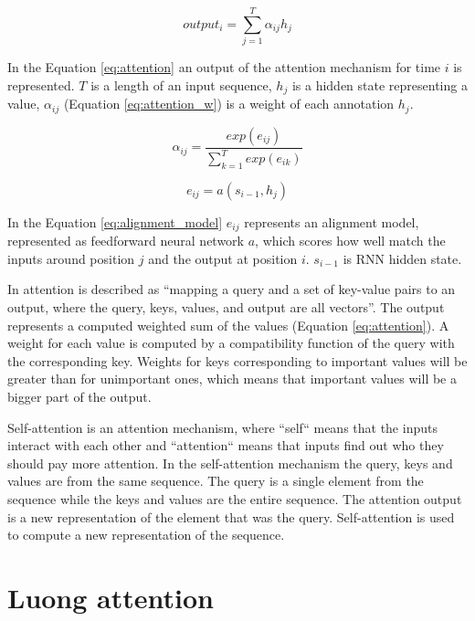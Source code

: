
\begin{equation} \label{eq:attention}
output_i = \sum_{j=1}^{T} \alpha_{ij} h_j
\end{equation}
 
In the Equation \ref{eq:attention} an output of the attention mechanism for time $i$ is represented. $T$ is a length of an input sequence, $h_j$ is a hidden state representing a value, $\alpha_{ij}$ (Equation \ref{eq:attention_w}) is a weight of each annotation $h_j$.

\begin{equation} \label{eq:attention_w}
\alpha_{ij} = \frac{exp(e_{ij})}{\sum_{k=1}^{T} exp(e_{ik})}
\end{equation}

\begin{equation} \label{eq:alignment_model}
e_{ij} = a(s_{i-1}, h_j)
\end{equation}

In the Equation \ref{eq:alignment_model} $e_{ij}$ represents an alignment model, represented as feedforward neural network $a$, which scores how well match the inputs around position $j$ and the output at position $i$. $s_{i-1}$ is RNN hidden state.

In \cite{vaswani2017attention} attention is described as ``mapping a query and a set of key-value pairs to an output, where the query, keys, values, and output are all vectors''. The output represents a computed weighted sum of the values (Equation \ref{eq:attention}). A weight for each value is computed by a compatibility function of the query with the corresponding key. Weights for keys corresponding to important values will be greater than for unimportant ones, which means that important values will be a bigger part of the output. 

Self-attention is an attention mechanism, where ``self`` means that the inputs interact with each other and ``attention`` means that inputs find out who they should pay more attention. In the self-attention mechanism the query, keys and values are from the same sequence. The query is a single element from the sequence while the keys and values are the entire sequence. The attention output is a new representation of the element that was the query. Self-attention is used to compute a new representation of the sequence.  

\section{Luong attention}\label{sec_luong}

